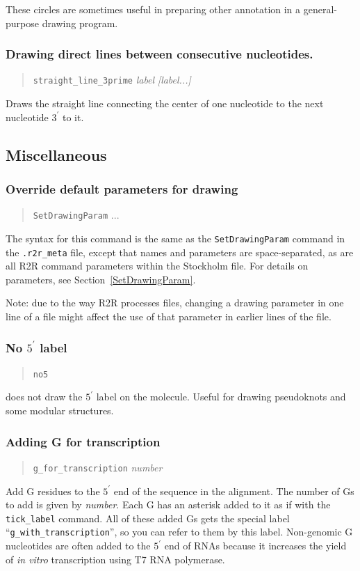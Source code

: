 \documentclass[letterpaper,12pt]{report}
\newcommand{\example}[1]{
\begin{quote}
{\raggedright
#1
}
\end{quote}
}
\begin{document}
These circles are sometimes useful in preparing other annotation in a general-purpose drawing program.

\subsubsection{Drawing direct lines between consecutive nucleotides.}
\example{{\tt straight\_line\_3prime} {\it label} {\it [label...]}}

Draws the straight line connecting the center of one nucleotide to the next nucleotide $3^\prime$ to it.

\subsection{Miscellaneous}
\subsubsection{Override default parameters for drawing}
\example{{\tt SetDrawingParam} ...}

The syntax for this command is the same as the {\tt SetDrawingParam} command in the {\tt .r2r\_meta} file, except that names and parameters are space-separated, as are all R2R command parameters within the Stockholm file.  For details on parameters, see Section~\ref{SetDrawingParam}.

Note: due to the way R2R processes files, changing a drawing parameter in one line of a file might
affect the use of that parameter in earlier lines of the file.

\subsubsection[No 5 prime label]{No $5^\prime$ label}
\example{{\tt no5}}

does not draw the $5^\prime$ label on the molecule.  Useful for drawing
pseudoknots and some modular structures.

\subsubsection{Adding G for transcription}
\example{{\tt g\_for\_transcription} \textit{number}}

Add G residues to the $5^\prime$ end of the sequence in the alignment. 
The number of Gs to add is given by  \textit{number}. Each G has an
asterisk added to it as if with the {\tt tick\_label} command. All of these
added Gs gets the special label
{\textquotedblleft}{\tt g\_with\_transcription}{\textquotedblright}, so you can refer to them by this label.
Non-genomic G nucleotides are often added to the $5^\prime$ end of RNAs because it increases the yield of {\it in vitro} transcription using T7 RNA polymerase.
\end{document}
